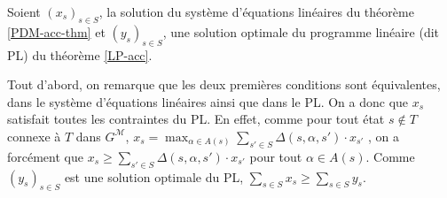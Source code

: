 \documentclass[12pt,a4paper]{report}
\theoremstyle{definition}%
\theoremstyle{remark}
\begin{document}
Soient $(x_s)_{s \in S}$, la solution du système d'équations linéaires du
théorème \ref{PDM-acc-thm} et $(y_s)_{s \in S}$, une solution optimale
 du programme linéaire (dit PL) du théorème \ref{LP-acc}. \par
Tout d'abord, on remarque que les deux premières conditions sont équivalentes, dans le
système d'équations linéaires ainsi que dans le PL.
On a donc que $x_s$ satisfait toutes les contraintes du PL. En effet,
comme pour tout état $s \not\in T$ connexe à $T$ dans $G^\mathcal{M}$, $x_s = \max_{\alpha \in A(s)} \sum_{s' \in S} \Delta(s, \alpha, s') \cdot x_{s'}$
, on a forcément que $x_s \geq \sum_{s' \in S} \Delta(s, \alpha, s') \cdot x_{s'}$ pour tout
$\alpha \in A(s)$.
Comme $(y_s)_{s \in S}$ est une solution optimale du PL,
$\sum_{s \in S} x_s \geq \sum_{s \in S} y_s$. \par
\end{document}
